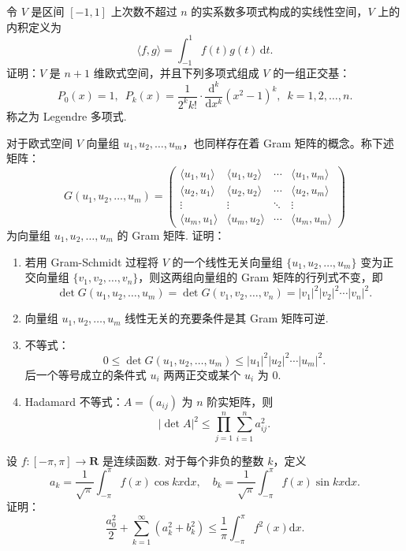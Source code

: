 \begin{exercise}
    \begin{exgroup}
        \item 令 $V$ 是区间 $[-1, 1]$ 上次数不超过 $n$ 的实系数多项式构成的实线性空间，$V$ 上的内积定义为
        \[
            \langle f, g \rangle = \int_{-1}^{1} f(t)g(t)\,\mathrm{d}t.
        \]
        证明：$V$ 是 $n + 1$ 维欧式空间，并且下列多项式组成 $V$ 的一组正交基：
        \[
            P_0(x) = 1, \enspace P_k(x) = \dfrac{1}{2^k k!} \cdot \dfrac{\mathrm{d}^k}{\mathrm{d}x^k} (x^2 - 1)^k, \enspace k = 1, 2, \ldots, n.
        \]
        称之为 Legendre 多项式.
        \item 对于欧式空间 $V$ 向量组 $u_1, u_2, \ldots, u_m$，也同样存在着 Gram 矩阵的概念。称下述矩阵：
        \[
            G(u_1, u_2, \ldots, u_m) = \begin{pmatrix}
                \langle u_1, u_1 \rangle & \langle u_1, u_2 \rangle & \cdots & \langle u_1, u_m \rangle \\
                \langle u_2, u_1 \rangle & \langle u_2, u_2 \rangle & \cdots & \langle u_2, u_m \rangle \\
                \vdots                   & \vdots                   & \ddots & \vdots                   \\
                \langle u_m, u_1 \rangle & \langle u_m, u_2 \rangle & \cdots & \langle u_m, u_m \rangle
            \end{pmatrix}
        \]
        为向量组 $u_1, u_2, \ldots, u_m$ 的 Gram 矩阵. 证明：
        \begin{enumerate}
            \item 若用 Gram-Schmidt 过程将 $ V $ 的一个线性无关向量组 $\{u_1, u_2, \ldots, u_m\}$ 变为正交向量组 $\{v_1, v_2, \ldots, v_n\}$，则这两组向量组的 Gram 矩阵的行列式不变，即
                  \[
                      \det G(u_1, u_2, \ldots, u_m) = \det G(v_1, v_2, \ldots, v_n) = \lvert v_1 \rvert^2 \lvert v_2 \rvert^2 \cdots \lvert v_n \rvert^2.
                  \]
            \item 向量组 $u_1, u_2, \ldots, u_m$ 线性无关的充要条件是其 Gram 矩阵可逆.
            \item 不等式：
                  \[
                      0 \leqslant \det G(u_1, u_2, \ldots, u_m) \leqslant \lvert u_1 \rvert^2 \lvert u_2 \rvert^2 \cdots \lvert u_m \rvert^2.
                  \]
                  后一个等号成立的条件式 $u_i$ 两两正交或某个 $u_i$ 为 0.
            \item Hadamard 不等式：$A = (a_{ij})$ 为 $n$ 阶实矩阵，则
                  \[
                      \lvert \det A \rvert^2 \leqslant \prod_{j = 1}^n \sum_{i = 1}^n a_{ij}^2.
                  \]
        \end{enumerate}
        \item 设 $f: [-\pi, \pi] \to \mathbf{R}$ 是连续函数. 对于每个非负的整数 $k$，定义
        \[
            a_k = \dfrac{1}{\sqrt{\pi}} \int_{-\pi}^{\pi} f(x) \cos kx \mathrm{d}x, \quad b_k = \dfrac{1}{\sqrt{\pi}} \int_{-\pi}^{\pi} f(x) \sin kx \mathrm{d}x.
        \]
        证明：\[
            \dfrac{a_0^2}{2} + \sum_{k = 1}^{\infty} (a_k^2 + b_k^2) \leqslant \dfrac{1}{\pi} \int_{-\pi}^{\pi} f^2(x) \mathrm{d}x.
        \]
    \end{exgroup}
\end{exercise}
